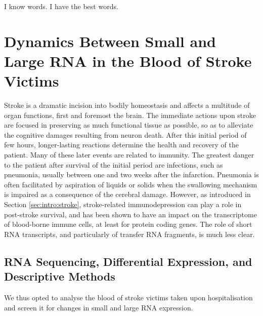 \begin{savequote}[75mm]
I know words. I have the best words.
\end{savequote}

\chapter[Dynamics Between Small and Large RNA\texorpdfstring{\\}{} in the Blood of Stroke Victims]{Dynamics Between Small and Large RNA in the Blood of Stroke Victims}

Stroke is a dramatic incision into bodily homeostasis and affects a multitude of organ functions, first and foremost the brain. The immediate actions upon stroke are focused in preserving as much functional tissue as possible, so as to alleviate the cognitive damages resulting from neuron death. After this initial period of few hours, longer-lasting reactions determine the health and recovery of the patient. Many of these later events are related to immunity. The greatest danger to the patient after survival of the initial period are infections, such as pneumonia, usually between one and two weeks after the infarction. Pneumonia is often facilitated by aspiration of liquids or solids when the swallowing mechanism is impaired as a consequence of the cerebral damage. However, as introduced in Section \ref{sec:intro:stroke}, stroke-related immunodepression can play a role in post-stroke survival, and has been shown to have an impact on the transcriptome of blood-borne immune cells, at least for protein coding genes. The role of short RNA transcripts, and particularly of transfer RNA fragments, is much less clear.

\section{RNA Sequencing, Differential Expression, and Descriptive Methods}

We thus opted to analyse the blood of stroke victims taken upon hospitalisation and screen it for changes in small and large RNA expression.

